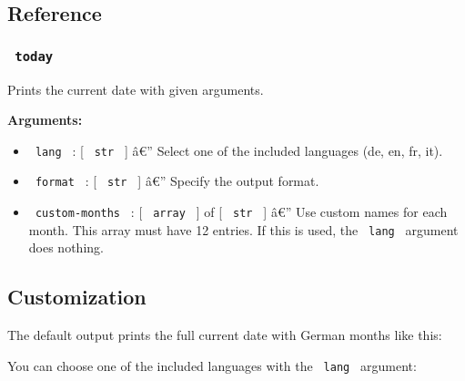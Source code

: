 \subsection{Reference}\label{reference}

\subsubsection{\texorpdfstring{\texttt{\ today\ }}{ today }}\label{today}

Prints the current date with given arguments.

\begin{Shaded}
\begin{Highlighting}[]
\end{Highlighting}
\end{Shaded}

\textbf{Arguments:}

\begin{itemize}
\tightlist
\item
  \texttt{\ lang\ } : {[} \texttt{\ str\ } {]} â€'' Select one of the
  included languages (de, en, fr, it).
\item
  \texttt{\ format\ } : {[} \texttt{\ str\ } {]} â€'' Specify the output
  format.
\item
  \texttt{\ custom-months\ } : {[} \texttt{\ array\ } {]} of {[}
  \texttt{\ str\ } {]} â€'' Use custom names for each month. This array
  must have 12 entries. If this is used, the \texttt{\ lang\ } argument
  does nothing.
\end{itemize}

\subsection{Customization}\label{customization}

The default output prints the full current date with German months like
this:

\begin{Shaded}
\begin{Highlighting}[]
\end{Highlighting}
\end{Shaded}

You can choose one of the included languages with the \texttt{\ lang\ }
argument:


